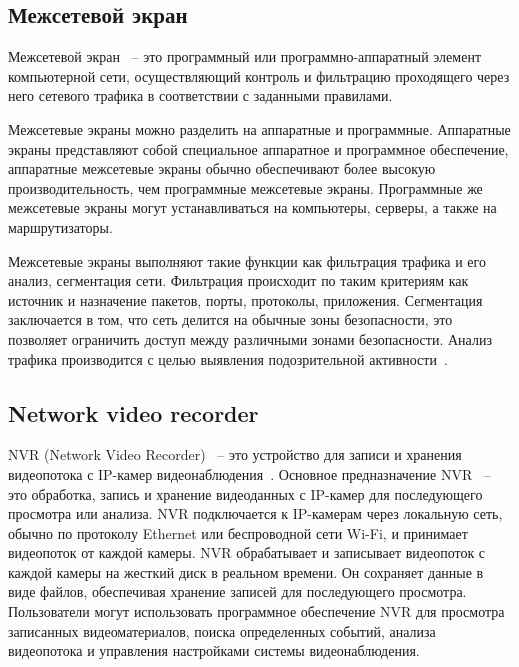 \subsection{Межсетевой экран}

Межсетевой экран ~-- это программный или программно-аппаратный элемент компьютерной сети, 
осуществляющий контроль и фильтрацию проходящего через него сетевого трафика в соответствии с заданными правилами.

Межсетевые экраны можно разделить на аппаратные и программные. Аппаратные экраны представляют собой 
специальное аппаратное и программное обеспечение, аппаратные межсетевые экраны обычно обеспечивают более высокую производительность, 
чем программные межсетевые экраны. Программные же межсетевые экраны могут устанавливаться на компьютеры, серверы, а также на 
маршрутизаторы. 

Межсетевые экраны выполняют такие функции как фильтрация трафика и его анализ, сегментация сети. Фильтрация 
происходит по таким критериям как источник и назначение пакетов, порты, протоколы, приложения. Сегментация
заключается в том, что сеть делится на обычные зоны безопасности, это позволяет ограничить доступ между различными зонами безопасности.
Анализ трафика производится с целью выявления подозрительной активности~\cite{computer_networks}.

\subsection{Network video recorder}

NVR (Network Video Recorder) ~-- это устройство для записи и хранения видеопотока с IP-камер видеонаблюдения~\cite{nvr}. 
Основное предназначение NVR ~-- это обработка, запись и хранение видеоданных с IP-камер для последующего просмотра или анализа.
NVR подключается к IP-камерам через локальную сеть, обычно по протоколу Ethernet или беспроводной сети Wi-Fi, 
и принимает видеопоток от каждой камеры. NVR обрабатывает и записывает видеопоток с каждой камеры на жесткий диск в реальном времени. 
Он сохраняет данные в виде файлов, обеспечивая хранение записей для последующего просмотра.
Пользователи могут использовать программное обеспечение NVR для просмотра записанных видеоматериалов, поиска определенных событий, 
анализа видеопотока и управления настройками системы видеонаблюдения.